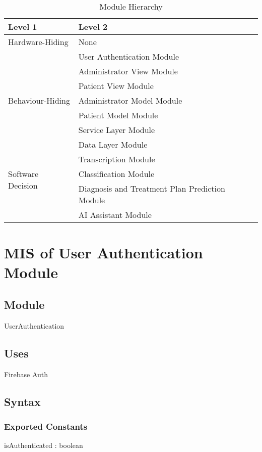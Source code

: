 \documentclass[12pt, titlepage]{article}
\begin{document}
\begin{table}[h!]
\centering
\begin{tabular}{p{} p{}}
\toprule
\textbf{Level 1} & \textbf{Level 2}\\
\midrule
{Hardware-Hiding} & None \\
\midrule
\multirow{7}{0.3\textwidth}{Behaviour-Hiding} & User Authentication Module\\
& Administrator View Module\\
& Patient View Module\\
& Administrator Model Module\\
& Patient Model Module\\
& Service Layer Module\\
& Data Layer Module\\
\midrule
\multirow{3}{0.3\textwidth}{Software Decision} & Transcription Module\\
& Classification Module\\
& Diagnosis and Treatment Plan Prediction Module\\
& AI Assistant Module \\
\bottomrule
\end{tabular}
\caption{Module Hierarchy}
\label{TblMH}
\end{table}

\newpage

\section{MIS of User Authentication Module} \label{Module_UserAuth}

\subsection{Module}
UserAuthentication

\subsection{Uses}
Firebase Auth\\

\subsection{Syntax}

\subsubsection{Exported Constants}
isAuthenticated : boolean
\end{document}
